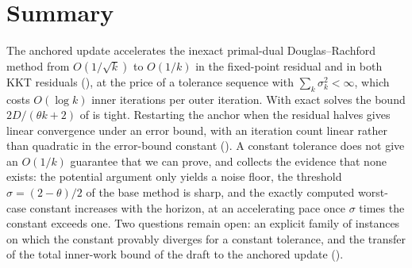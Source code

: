 \section{Summary}
The anchored update  accelerates the inexact primal-dual Douglas--Rachford method from $O(1/\sqrt{k})$ to $O(1/k)$ in the fixed-point residual and in both KKT residuals (), at the price of a tolerance sequence with $\sum_k\sigma_k^2 < \infty$, which costs $O(\log k)$ inner iterations per outer iteration.
With exact solves the bound $2D/(\theta k+2)$ of  is tight.
Restarting the anchor when the residual halves gives linear convergence under an error bound, with an iteration count linear rather than quadratic in the error-bound constant ().
A constant tolerance does not give an $O(1/k)$ guarantee that we can prove, and  collects the evidence that none exists: the potential argument only yields a noise floor, the threshold $\sigma = (2-\theta)/2$ of the base method is sharp, and the exactly computed worst-case constant increases with the horizon, at an accelerating pace once $\sigma$ times the constant exceeds one.
Two questions remain open: an explicit family of instances on which the constant provably diverges for a constant tolerance, and the transfer of the total inner-work bound of the draft to the anchored update ().




